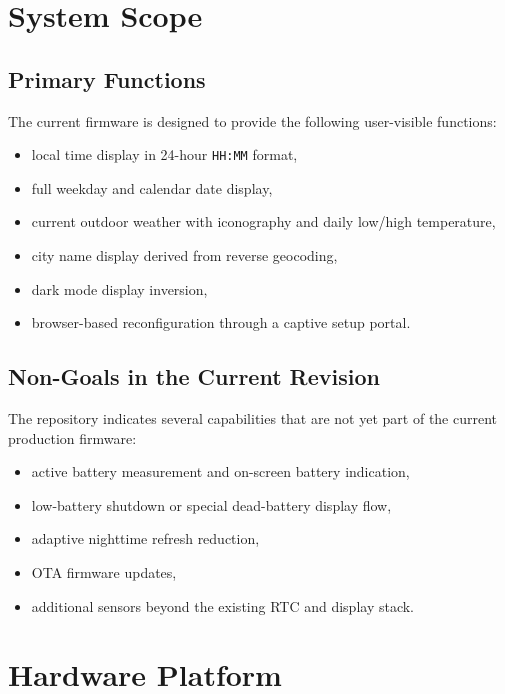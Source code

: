 \documentclass[11pt]{article}
\begin{document}
\section{System Scope}
\subsection{Primary Functions}
The current firmware is designed to provide the following user-visible functions:
\begin{itemize}
  \item local time display in 24-hour \texttt{HH:MM} format,
  \item full weekday and calendar date display,
  \item current outdoor weather with iconography and daily low/high temperature,
  \item city name display derived from reverse geocoding,
  \item dark mode display inversion,
  \item browser-based reconfiguration through a captive setup portal.
\end{itemize}

\subsection{Non-Goals in the Current Revision}
The repository indicates several capabilities that are not yet part of the current production firmware:
\begin{itemize}
  \item active battery measurement and on-screen battery indication,
  \item low-battery shutdown or special dead-battery display flow,
  \item adaptive nighttime refresh reduction,
  \item OTA firmware updates,
  \item additional sensors beyond the existing RTC and display stack.
\end{itemize}

\section{Hardware Platform}
\end{document}

